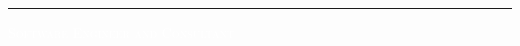 \documentclass[10pt,A4]{article}
\newcounter{a}
\newcounter{b}
\newcounter{c}
\newcommand{\mystrut}{\rule[-.3\baselineskip]{0pt}{\baselineskip}}
\begin{document}
\pagestyle{fancy}	


\mystrut
\vspace{-12pt}
\begin{center}
\\[-30pt]
\textcolor{sectcol}{\hrule}
\vspace{5pt}
\Large{\textcolor{white}{\textsc{Software Engineer and Consultant}}}\\
\end{center}

\normalfont





\vspace{16pt}
\end{document}
